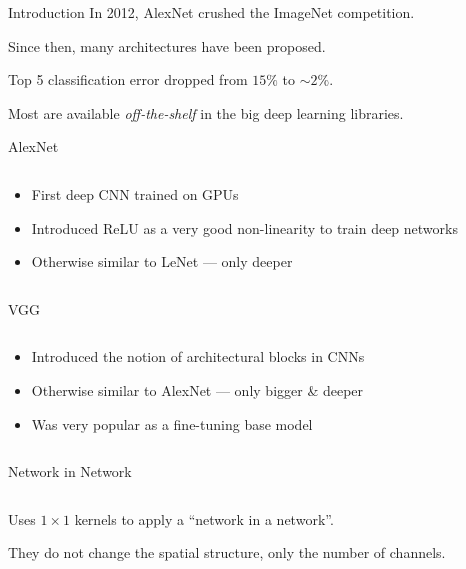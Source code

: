 \begin{frame}{Introduction}
  In 2012, AlexNet crushed the ImageNet competition.
  
  Since then, many architectures have been proposed.

  Top 5 classification error dropped from $15\%$ to $\sim2\%$.

  Most are available \emph{off-the-shelf} in the big deep learning libraries.
\end{frame}

\begin{frame}{AlexNet}
  \begin{columns}
    \begin{column}{0.5\textwidth}
      \begin{itemize}
        \item First deep CNN trained on GPUs
        \item Introduced ReLU as a very good non-linearity to train deep networks
        \item Otherwise similar to LeNet --- only deeper
      \end{itemize}
    \end{column}
    \begin{column}{0.5\textwidth}
    \end{column}
  \end{columns}
\end{frame}

\begin{frame}{VGG}
  \begin{columns}
    \begin{column}{0.45\textwidth}
      \begin{itemize}
        \item Introduced the notion of architectural blocks in CNNs
        \item Otherwise similar to AlexNet --- only bigger \& deeper
        \item Was very popular as a fine-tuning base model
      \end{itemize}
    \end{column}
    \begin{column}{0.55\textwidth}
    \end{column}
  \end{columns}
\end{frame}

\begin{frame}{Network in Network}
  \begin{columns}
    \begin{column}{0.4\textwidth}
      Uses  $1 \times 1$ kernels to apply a “network in a network”.

      They do not change the spatial structure, only the number of channels.
    \end{column}
    \begin{column}{0.6\textwidth}
    \end{column}
  \end{columns}
\end{frame}

